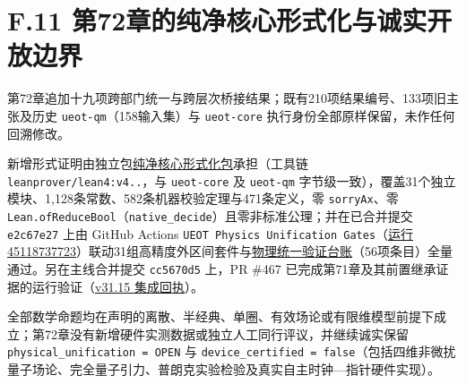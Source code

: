 \documentclass[
  11pt,
  oneside]{book}
\begin{document}
\section{F.11 第72章的纯净核心形式化与诚实开放边界}

第72章追加十九项跨部门统一与跨层次桥接结果；既有210项结果编号、133项旧主张及历史
\texttt{ueot-\allowbreak qm}（158输入集）与 \texttt{ueot-\allowbreak core}
执行身份全部原样保留，未作任何回溯修改。

新增形式证明由独立包\href{../../../formalization/ueot-physics-unification/README.md}{纯净核心形式化包}承担（工具链
\texttt{leanprover/\allowbreak lean4:v4..}，与 \texttt{ueot-\allowbreak core} 及
\texttt{ueot-\allowbreak qm}
字节级一致），覆盖31个独立模块、1,128条常数、582条机器校验定理与471条定义，零
\texttt{sorry\allowbreak Ax}、零
\texttt{Lean.\allowbreak of\allowbreak Reduce\allowbreak Bool}（\texttt{native\_\allowbreak decide}）且零非标准公理；并在已合并提交
\texttt{e2c67e27} 上由 GitHub Actions
\texttt{UEOT\ Physics\ Unification\ Gates}（\href{https://github.com/MurphyHoops/UEOT/actions/runs/45118737723}{运行
45118737723}）联动31组高精度外区间套件与\href{../../../validation/physics_unification/VALIDATION_LEDGER.json}{物理统一验证台账}（56项条目）全量通过。另在主线合并提交
\texttt{cc5670d5} 上，PR \#467
已完成第71章及其前置继承证据的运行验证（\href{../kernel/evidence/v31.15/integration-verification.json}{v31.15
集成回执}）。

全部数学命题均在声明的离散、半经典、单圈、有效场论或有限维模型前提下成立；第72章没有新增硬件实测数据或独立人工同行评议，并继续诚实保留
\texttt{physical\_\allowbreak unification\ =\ OPEN} 与
\texttt{device\_\allowbreak certified\ =\ false}（包括四维非微扰量子场论、完全量子引力、普朗克实验检验及真实自主时钟---指针硬件实现）。

\backmatter
\end{document}
